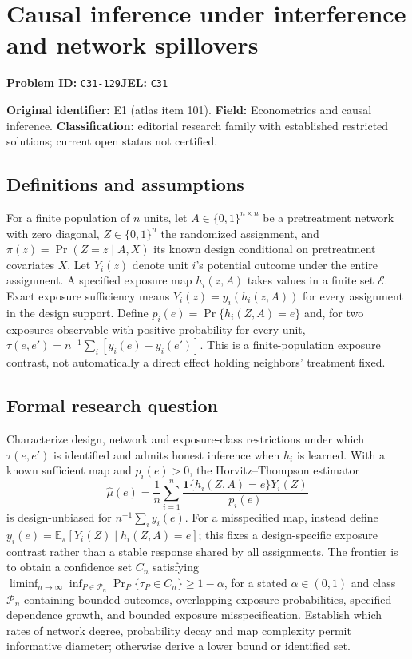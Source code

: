 \documentclass[11pt,a4paper]{article}
\begin{document}
\section*{Causal inference under interference and network spillovers}
\textbf{Problem ID:} \texttt{C31-129}\quad \textbf{JEL:} \texttt{C31}\par
\label{problem:OP-0101}
\label{atlas:prob:E1}

\noindent\textbf{Original identifier:} E1 (atlas item 101). \textbf{Field:} Econometrics and causal inference. \textbf{Classification:} editorial research family with established restricted solutions; current open status not certified.

\subsection*{Definitions and assumptions}

For a finite population of $n$ units, let $A\in\{0,1\}^{n\times n}$ be a pretreatment network with zero diagonal, $Z\in\{0,1\}^n$ the randomized assignment, and $\pi(z)=\Pr(Z=z\mid A,X)$ its known design conditional on pretreatment covariates $X$. Let $Y_i(z)$ denote unit $i$'s potential outcome under the entire assignment. A specified exposure map $h_i(z,A)$ takes values in a finite set $\mathcal E$. Exact exposure sufficiency means $Y_i(z)=y_i(h_i(z,A))$ for every assignment in the design support. Define $p_i(e)=\Pr\{h_i(Z,A)=e\}$ and, for two exposures observable with positive probability for every unit, $\tau(e,e')=n^{-1}\sum_i[y_i(e)-y_i(e')]$. This is a finite-population exposure contrast, not automatically a direct effect holding neighbors' treatment fixed.

\subsection*{Formal research question}

Characterize design, network and exposure-class restrictions under which $\tau(e,e')$ is identified and admits honest inference when $h_i$ is learned. With a known sufficient map and $p_i(e)>0$, the Horvitz--Thompson estimator
\[
\widehat\mu(e)=\frac1n\sum_{i=1}^n
\frac{\mathbf1\{h_i(Z,A)=e\}Y_i(Z)}{p_i(e)}
\]
is design-unbiased for $n^{-1}\sum_i y_i(e)$. For a misspecified map, instead define $y_i(e)=\mathbb E_\pi[Y_i(Z)\mid h_i(Z,A)=e]$; this fixes a design-specific exposure contrast rather than a stable response shared by all assignments. The frontier is to obtain a confidence set $C_n$ satisfying $\liminf_{n\to\infty}\inf_{P\in\mathcal P_n}\Pr_P\{\tau_P\in C_n\}\ge1-\alpha$, for a stated $\alpha\in(0,1)$ and class $\mathcal P_n$ containing bounded outcomes, overlapping exposure probabilities, specified dependence growth, and bounded exposure misspecification. Establish which rates of network degree, probability decay and map complexity permit informative diameter; otherwise derive a lower bound or identified set.
\end{document}
